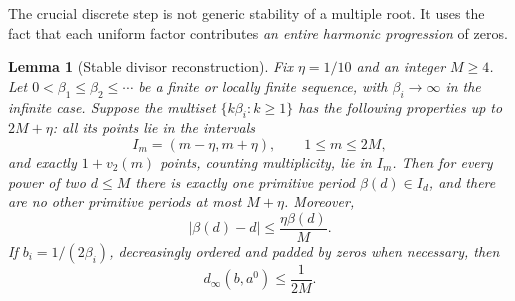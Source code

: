 \documentclass[11pt,a4paper]{article}
\numberwithin{equation}{section}
\newtheorem{lemma}[theorem]{Lemma}
\theoremstyle{definition}
\theoremstyle{remark}
\begin{document}
The crucial discrete step is not generic stability of a multiple root.
It uses the fact that each uniform factor contributes \emph{an entire harmonic
progression} of zeros.

\begin{lemma}[Stable divisor reconstruction]
\label{lem:periods}
Fix $\eta=1/10$ and an integer $M\ge4$. Let
$0<\beta_1\le\beta_2\le\cdots$ be a finite or locally finite sequence,
with $\beta_i\to\infty$ in the infinite case. Suppose the multiset
$\{k\beta_i:k\ge1\}$ has the following properties up to $2M+\eta$:
all its points lie in the intervals
\[
 I_m=(m-\eta,m+\eta),\qquad 1\le m\le2M,
\]
and exactly $1+v_2(m)$ points, counting multiplicity, lie in $I_m$.
Then for every power of two $d\le M$ there is exactly one primitive period
$\beta(d)\in I_d$, and there are no other primitive periods at most
$M+\eta$. Moreover,
\begin{equation}
 |\beta(d)-d|\le\frac{\eta\beta(d)}{M}.
 \label{eq:period-accuracy}
\end{equation}
If $b_i=1/(2\beta_i)$, decreasingly ordered and padded by zeros when necessary,
then
\begin{equation}
 d_\infty(b,a^0)\le\frac1{2M}.
 \label{eq:period-spectral}
\end{equation}
\end{lemma}
\end{document}
